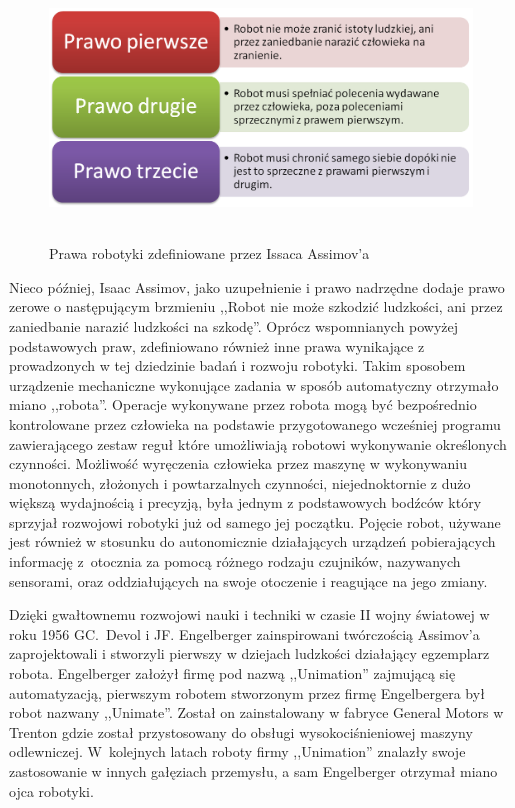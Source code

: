 \begin{figure}[h!]
	\centering
	\includegraphics[height=70mm]{../images/ch01/assimov_laws.png}
	\caption{Prawa robotyki zdefiniowane przez Issaca Assimov'a}
	\label{fig:Assimov_Laws}
\end{figure}

Nieco później, Isaac Assimov, jako uzupełnienie i prawo nadrzędne dodaje prawo
zerowe o następującym brzmieniu ,,Robot nie może szkodzić ludzkości, ani przez
zaniedbanie narazić ludzkości na szkodę''\cite{website:robotyka-pl}. Oprócz
wspomnianych powyżej podstawowych praw, zdefiniowano również inne prawa
wynikające z prowadzonych w tej dziedzinie badań i rozwoju robotyki.
\newpage
Takim sposobem urządzenie mechaniczne wykonujące zadania w sposób automatyczny
otrzymało miano ,,robota''\cite{website:asimo-pl}. Operacje wykonywane przez
robota mogą być bezpośrednio kontrolowane przez człowieka na podstawie przygotowanego wcześniej
programu zawierającego zestaw reguł które umożliwiają robotowi wykonywanie
określonych czynności. Możliwość wyręczenia człowieka przez maszynę w
wykonywaniu monotonnych, złożonych i powtarzalnych czynności, niejednoktornie
z dużo większą wydajnością i precyzją, była jednym z podstawowych bodźców
który sprzyjał rozwojowi robotyki już od samego jej początku. Pojęcie robot,
używane jest również w stosunku do autonomicznie działających urządzeń
pobierających informację z~otocznia za pomocą różnego rodzaju czujników,
nazywanych sensorami, oraz oddziałujących na swoje otoczenie i reagujące na
jego zmiany. 

Dzięki gwałtownemu rozwojowi nauki i techniki w czasie II wojny światowej w roku
1956 GC.~Devol i JF. Engelberger zainspirowani twórczością Assimov'a zaprojektowali i
stworzyli pierwszy w dziejach ludzkości działający egzemplarz robota\cite{website:robotyka-pl}.
Engelberger założył firmę pod nazwą ,,Unimation'' zajmującą się automatyzacją,
pierwszym robotem stworzonym przez firmę Engelbergera był robot nazwany
,,Unimate''. Został on zainstalowany w fabryce General Motors w Trenton gdzie
został przystosowany do obsługi wysokociśnieniowej maszyny odlewniczej.
W~kolejnych latach roboty firmy ,,Unimation'' znalazły swoje zastosowanie w
innych gałęziach przemysłu, a sam Engelberger otrzymał miano ojca
robotyki.\cite{website:robotyka-pl}

